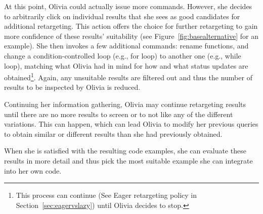 
At this point, Olivia could actually issue more commands. However, she decides to arbitrarily click on individual results that she sees as good candidates for additional retargeting. This action offers the choice for further retargeting to gain more confidence of these results' suitability (see Figure~\ref{fig:basealternative} for an example). She then invokes a few additional commands: rename functions, and change a condition-controlled loop (e.g., for loop) to another one (e.g., while loop), matching what Olivia had in mind for how and what status updates are obtained\footnote{This process can continue (See Eager retargeting policy in Section~\ref{sec:eagervslazy}) until Olivia decides to stop.}. Again, any unsuitable results are filtered out and thus the number of results to be inspected by Olivia is reduced.

Continuing her information gathering, Olivia may continue retargeting results until there are no more results to screen or to not like any of the different variations. This can happen, which can lead Olivia to modify her previous queries to obtain similar or different results than she had previously obtained.

When she is satisfied with the resulting code examples, she can evaluate these results in more detail and thus pick the most suitable example she can integrate into her own code.

